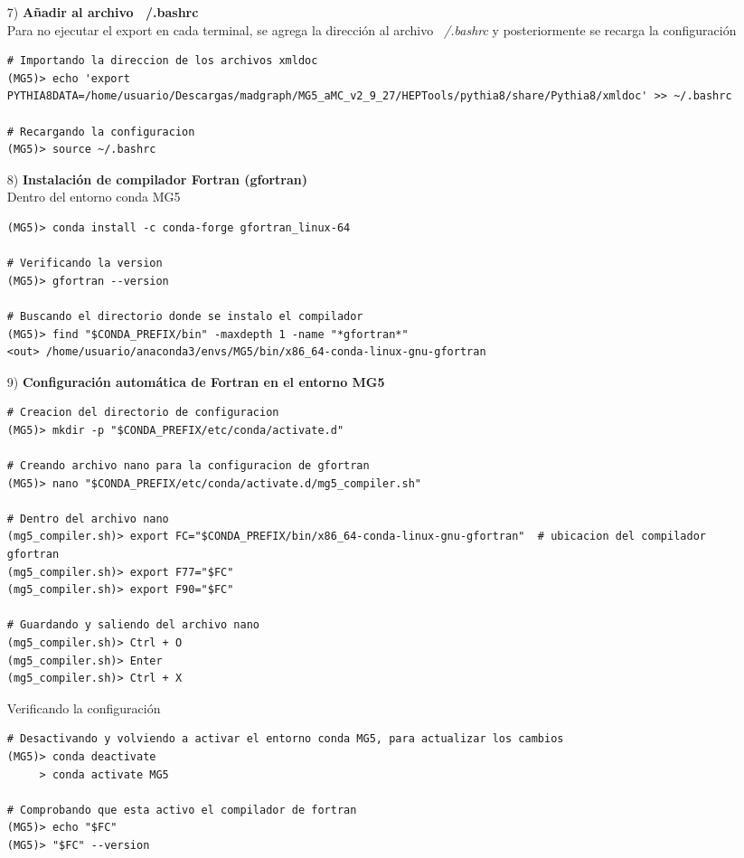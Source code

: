 \begin{itemize}
\begin{lstlisting}
# Ejecutando en la terminal
(MG5)> export PYTHIA8DATA=/home/usuario/Descargas/MG5_aMC_v2_9_27/HEPTools/pythia8/share/Pythia8/xmldoc

# Comprobando la ubicacion
(MG5)> echo "$PYTHIA8DATA"
\end{lstlisting}
    \item[7)] \textbf{Añadir al archivo ~/.bashrc}\\
    Para no ejecutar el export en cada terminal, se agrega la dirección al archivo \textit{~/.bashrc} y posteriormente se recarga la configuración
\begin{lstlisting}
# Importando la direccion de los archivos xmldoc
(MG5)> echo 'export PYTHIA8DATA=/home/usuario/Descargas/madgraph/MG5_aMC_v2_9_27/HEPTools/pythia8/share/Pythia8/xmldoc' >> ~/.bashrc

# Recargando la configuracion
(MG5)> source ~/.bashrc
\end{lstlisting}
    \item[8)] \textbf{Instalación de compilador Fortran (gfortran)}\\
    Dentro del entorno conda MG5 
\begin{lstlisting}
(MG5)> conda install -c conda-forge gfortran_linux-64

# Verificando la version
(MG5)> gfortran --version

# Buscando el directorio donde se instalo el compilador
(MG5)> find "$CONDA_PREFIX/bin" -maxdepth 1 -name "*gfortran*"
<out> /home/usuario/anaconda3/envs/MG5/bin/x86_64-conda-linux-gnu-gfortran
\end{lstlisting}
    \item[9)] \textbf{Configuración automática de Fortran en el entorno MG5}
    \begin{lstlisting}
# Creacion del directorio de configuracion
(MG5)> mkdir -p "$CONDA_PREFIX/etc/conda/activate.d"

# Creando archivo nano para la configuracion de gfortran
(MG5)> nano "$CONDA_PREFIX/etc/conda/activate.d/mg5_compiler.sh"

# Dentro del archivo nano 
(mg5_compiler.sh)> export FC="$CONDA_PREFIX/bin/x86_64-conda-linux-gnu-gfortran"  # ubicacion del compilador gfortran
(mg5_compiler.sh)> export F77="$FC"
(mg5_compiler.sh)> export F90="$FC"

# Guardando y saliendo del archivo nano
(mg5_compiler.sh)> Ctrl + O
(mg5_compiler.sh)> Enter
(mg5_compiler.sh)> Ctrl + X
\end{lstlisting}
    Verificando la configuración
    \begin{lstlisting}
# Desactivando y volviendo a activar el entorno conda MG5, para actualizar los cambios
(MG5)> conda deactivate
     > conda activate MG5

# Comprobando que esta activo el compilador de fortran
(MG5)> echo "$FC"
(MG5)> "$FC" --version
\end{lstlisting}
\end{itemize}